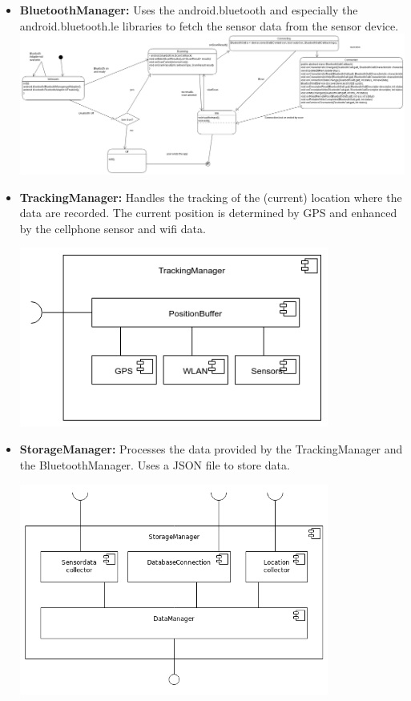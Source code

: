 \begin{itemize}
  \item \textbf{BluetoothManager:} Uses the android.bluetooth and especially the android.bluetooth.le libraries to fetch the sensor data from the sensor device. \\

 \hspace{-4cm} \includegraphics[width=1.4\textwidth]{pics/bt_state.png}

  \item \textbf{TrackingManager:} Handles the tracking of the (current) location where the data are recorded. The current position is determined by GPS and enhanced by the cellphone sensor and wifi data.

 \includegraphics[width=0.8\textwidth]{pics/TrackingManager_Composition.png}

  \item \textbf{StorageManager:} Processes the data provided by the TrackingManager and the BluetoothManager. Uses a JSON file to store data.

 \includegraphics[width=0.8\textwidth]{pics/StorageMgr_Composition.png}


\end{itemize}
